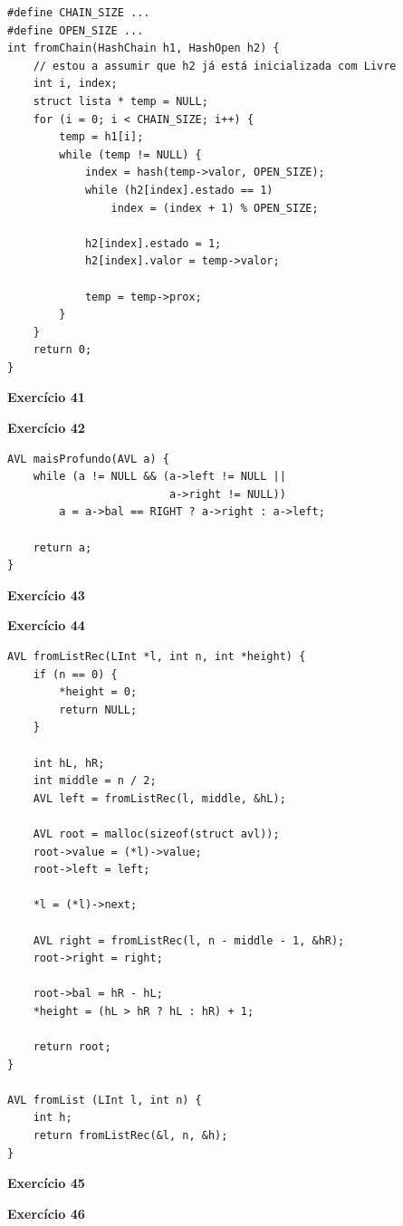 \documentclass[a4paper,11pt]{article}
\begin{document}
\begin{verbatim}
#define CHAIN_SIZE ...
#define OPEN_SIZE ...
int fromChain(HashChain h1, HashOpen h2) {
	// estou a assumir que h2 já está inicializada com Livre
	int i, index;
	struct lista * temp = NULL;
	for (i = 0; i < CHAIN_SIZE; i++) {
		temp = h1[i];
		while (temp != NULL) {
			index = hash(temp->valor, OPEN_SIZE);
			while (h2[index].estado == 1)
				index = (index + 1) % OPEN_SIZE;
			
			h2[index].estado = 1;
			h2[index].valor = temp->valor;
			
			temp = temp->prox;
		}
	}
	return 0;
}
\end{verbatim}

\noindent \textbf{Exercício 41}


\noindent \textbf{Exercício 42}

\begin{verbatim}
AVL maisProfundo(AVL a) {
	while (a != NULL && (a->left != NULL || 
						 a->right != NULL))
		a = a->bal == RIGHT ? a->right : a->left;
	
	return a;
}
\end{verbatim}

\noindent \textbf{Exercício 43}


\noindent \textbf{Exercício 44}

\begin{verbatim}
AVL fromListRec(LInt *l, int n, int *height) {
	if (n == 0) {
		*height = 0;
		return NULL;
	}
	
	int hL, hR;
	int middle = n / 2;
	AVL left = fromListRec(l, middle, &hL);
	
	AVL root = malloc(sizeof(struct avl));
	root->value = (*l)->value;
	root->left = left;
	
	*l = (*l)->next;
	
	AVL right = fromListRec(l, n - middle - 1, &hR);
	root->right = right;
	
	root->bal = hR - hL;
	*height = (hL > hR ? hL : hR) + 1;
	
	return root;
}

AVL fromList (LInt l, int n) {
	int h;
	return fromListRec(&l, n, &h);
}
\end{verbatim}

\noindent \textbf{Exercício 45}



\noindent \textbf{Exercício 46}
\end{document}
